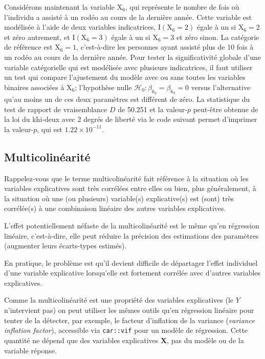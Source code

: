 \documentclass[
  11pt,
  letterpaper,
]{scrbook}
\theoremstyle{definition}
\theoremstyle{remark}
\begin{document}
Considérons maintenant la variable \(\mathrm{X}_6\), qui représente le
nombre de fois où l'individu a assisté à un rodéo au cours de la
dernière année. Cette variable est modélisée à l'aide de deux variables
indicatrices, \(\mathrm{I}(\mathrm{X}_6=2)\) égale à un si
\(\mathrm{X}_6=2\) et zéro autrement, et \(\mathrm{I}(\mathrm{X}_6=3)\)
égale à un si \(\mathrm{X}_6=3\) et zéro sinon. La catégorie de
référence est \(\mathrm{X}_6=1\), c'est-à-dire les personnes ayant
assisté plus de 10 fois à un rodéo au cours de la dernière année. Pour
tester la significativité globale d'une variable catégorielle qui est
modélisée avec plusieurs indicatrices, il faut utiliser un test qui
compare l'ajustement du modèle avec ou sans toutes les variables
binaires associées à \(\mathrm{X}_6\); l'hypothèse nulle
\(\mathscr{H}_0: \beta_{6_{\texttt{2}}}=\beta_{6_{\texttt{3}}}=0\)
versus l'alternative qu'au moins un de ces deux paramètres est différent
de zéro. La statistique du test de rapport de vraisemblance \(D\) de
50.251 et la valeur-\(p\) peut-être obtenue de la loi du khi-deux avec 2
degrés de liberté via le code suivant permet d'imprimer la valeur-\(p\),
qui est \(1.22 \times 10^{-11}\).

\hypertarget{multicolinuxe9arituxe9}{%
\subsection{Multicolinéarité}\label{multicolinuxe9arituxe9}}

Rappelez-vous que le terme multicolinéarité fait référence à la
situation où les variables explicatives sont très corrélées entre elles
ou bien, plus généralement, à la situation où une (ou plusieurs)
variable(s) explicative(s) est (sont) très corrélée(s) à une combinaison
linéaire des autres variables explicatives.

L'effet potentiellement néfaste de la multicolinéarité est le même qu'en
régression linéaire, c'est-à-dire, elle peut réduire la précision des
estimations des paramètres (augmenter leurs écarts-types estimés).

En pratique, le problème est qu'il devient difficile de départager
l'effet individuel d'une variable explicative lorsqu'elle est fortement
corrélée avec d'autres variables explicatives.

Comme la multicolinéarité est une propriété des variables explicatives
(le \(Y\) n'intervient pas) on peut utiliser les mêmes outils qu'en
régression linéaire pour tenter de la détecter, par exemple, le facteur
d'inflation de la variance (\emph{variance inflation factor}),
accessible via \texttt{car::vif} pour un modèle de régression. Cette
quantité ne dépend que des variables explicatives \(\mathbf{X}\), pas du
modèle ou de la variable réponse.
\end{document}

